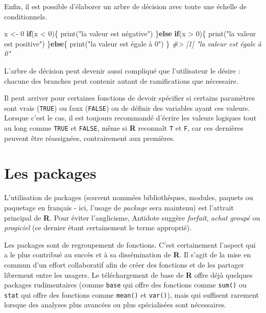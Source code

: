 \documentclass[
]{book}
\newenvironment{Shaded}{}{}
\newcommand{\CommentTok}[1]{\textit{#1}}
\newcommand{\ControlFlowTok}[1]{\textbf{#1}}
\newcommand{\DecValTok}[1]{#1}
\newcommand{\FunctionTok}[1]{#1}
\newcommand{\NormalTok}[1]{#1}
\newcommand{\OtherTok}[1]{#1}
\newcommand{\SpecialCharTok}[1]{#1}
\newcommand{\StringTok}[1]{#1}
\begin{document}
Enfin, il est possible d'élaborer un arbre de décision avec toute une échelle de conditionnels.

\begin{Shaded}
\begin{Highlighting}[]
\NormalTok{x }\OtherTok{\textless{}{-}} \DecValTok{0}
\ControlFlowTok{if}\NormalTok{(x }\SpecialCharTok{\textless{}} \DecValTok{0}\NormalTok{)\{}
  \FunctionTok{print}\NormalTok{(}\StringTok{"la valeur est négative"}\NormalTok{)}
\NormalTok{\}}\ControlFlowTok{else} \ControlFlowTok{if}\NormalTok{(x }\SpecialCharTok{\textgreater{}} \DecValTok{0}\NormalTok{)\{}
  \FunctionTok{print}\NormalTok{(}\StringTok{"la valeur est positive"}\NormalTok{)}
\NormalTok{\}}\ControlFlowTok{else}\NormalTok{\{}
  \FunctionTok{print}\NormalTok{(}\StringTok{"la valeur est égale à 0"}\NormalTok{)}
\NormalTok{\}}
\CommentTok{\#\textgreater{} [1] "la valeur est égale à 0"}
\end{Highlighting}
\end{Shaded}

L'arbre de décision peut devenir aussi compliqué que l'utilisateur le désire : chacune des branches peut contenir autant de ramifications que nécessaire.

Il peut arriver pour certaines fonctions de devoir spécifier si certains paramètres sont vrais (\texttt{TRUE}) ou faux (\texttt{FALSE}) ou de définir des variables ayant ces valeurs. Lorsque c'est le cas, il est toujours recommandé d'écrire les valeurs logiques tout au long comme \texttt{TRUE} et \texttt{FALSE}, même si \textbf{R} reconnaît \texttt{T} et \texttt{F}, car ces dernières peuvent être réassignées, contrairement aux premières.

\hypertarget{les-packages}{%
\section{Les packages}\label{les-packages}}

L'utilisation de packages (souvent nommées bibliothèques, modules, paquets ou paquetage en français - ici, l'usage de \emph{package} sera maintenu) est l'attrait principal de \textbf{R}. Pour éviter l'anglicisme, Antidote suggère \emph{forfait}, \emph{achat groupé} ou \emph{progiciel} (ce dernier étant certainement le terme approprié).

Les packages sont de regroupement de fonctions. C'est certainement l'aspect qui a le plus contribué au succès et à sa dissémination de \textbf{R}. Il s'agit de la mise en commun d'un effort collaboratif afin de créer des fonctions et de les partager librement entre les usagers. Le téléchargement de base de \textbf{R} offre déjà quelques packages rudimentaires (comme \texttt{base} qui offre des fonctions comme \texttt{sum()} ou \texttt{stat} qui offre des fonctions comme \texttt{mean()} et \texttt{var()}), mais qui suffisent rarement lorsque des analyses plus avancées ou plus spécialisées sont nécessaires.
\end{document}
